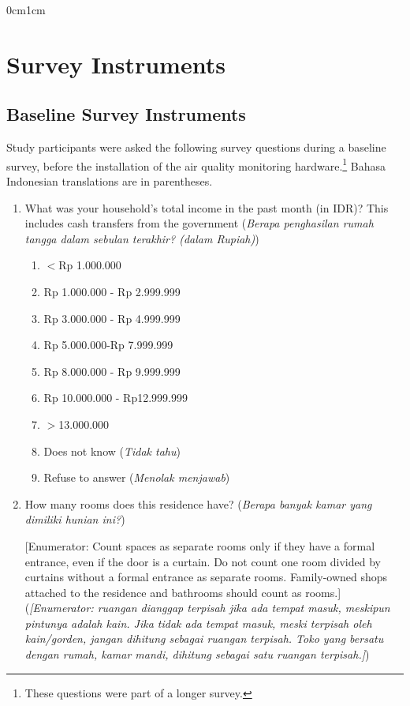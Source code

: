 \documentclass[9pt,twoside]{pnas-new}
\begin{document}
\SItext
\begin{adjustwidth}{0cm}{1cm} 
\section*{Survey Instruments}

\subsection*{Baseline Survey Instruments}

Study participants were asked the following survey questions during a baseline survey, before the installation of the air quality monitoring hardware.\footnote{These questions were part of a longer survey.} Bahasa Indonesian translations are in parentheses.

\begin{enumerate}
\item What was your household's total income in the past month (in IDR)? This includes cash transfers from the government (\textit{Berapa penghasilan rumah tangga dalam sebulan terakhir? (dalam Rupiah)})
\begin{enumerate}
    \item $<$Rp 1.000.000
    \item Rp 1.000.000 - Rp 2.999.999
    \item Rp 3.000.000 - Rp 4.999.999
    \item Rp 5.000.000-Rp 7.999.999
    \item Rp 8.000.000 - Rp 9.999.999
    \item Rp 10.000.000 - Rp12.999.999
    \item $>$13.000.000
        \item Does not know (\textit{Tidak tahu})
        \item Refuse to answer (\textit{Menolak menjawab})
\end{enumerate}
\item How many rooms does this residence have? (\textit{Berapa banyak kamar yang dimiliki hunian ini?})

[Enumerator: Count spaces as separate rooms only if they have a formal entrance, even if the door is a curtain. Do not count one room divided by curtains without a formal entrance as separate rooms. Family-owned shops attached to the residence and bathrooms should count as rooms.] \\ 
(\textit{[Enumerator: ruangan dianggap terpisah jika ada tempat masuk, meskipun pintunya adalah kain. Jika tidak ada tempat masuk, meski terpisah oleh kain/gorden, jangan dihitung sebagai ruangan terpisah. Toko yang bersatu dengan rumah, kamar mandi, dihitung sebagai satu ruangan terpisah.]})


\end{enumerate}
\end{adjustwidth}
\end{document}
